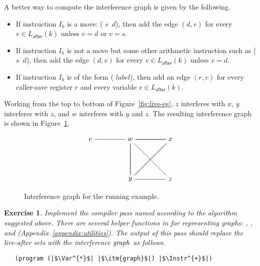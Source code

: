 \documentclass[11pt]{book}
\newtheorem{exercise}[theorem]{Exercise}
\begin{document}
A better way to compute the interference graph is given by the
following.

\begin{itemize}
\item If instruction $I_k$ is a move: ( $s$\, $d$), then add
  the edge $(d,v)$ for every $v \in L_{\mathsf{after}}(k)$ unless $v =
  d$ or $v = s$.

\item If instruction $I_k$ is not a move but some other arithmetic
  instruction such as ( $s$\, $d$), then add the edge $(d,v)$
  for every $v \in L_{\mathsf{after}}(k)$ unless $v = d$.
  
\item If instruction $I_k$ is of the form (
  $\mathit{label}$), then add an edge $(r,v)$ for every caller-save
  register $r$ and every variable $v \in L_{\mathsf{after}}(k)$.
\end{itemize}

Working from the top to bottom of Figure~\ref{fig:live-eg}, $z$
interferes with $x$, $y$ interferes with $z$, and $w$ interferes with
$y$ and $z$.  The resulting interference graph is shown in
Figure~\ref{fig:interfere}.

\begin{figure}[tbp]
\large
\[
\begin{tikzpicture}[baseline=(current  bounding  box.center)]
\node (v) at (0,0)   {$v$};
\node (w) at (2,0)   {$w$};
\node (x) at (4,0)   {$x$};
\node (y) at (2,-2)  {$y$};
\node (z) at (4,-2)  {$z$};

\draw (v) to (w);
\foreach \i in {w,x,y} 
{
  \foreach \j in {w,x,y}
  { 
    \draw (\i) to (\j);
  }
}
\draw (z) to (w);
\draw (z) to (y);
\end{tikzpicture}
\]
\caption{Interference graph for the running example.}
\label{fig:interfere}
\end{figure}


\begin{exercise}\normalfont
Implement the compiler pass named  according
to the algorithm suggested above.  There are several helper functions
in  for representing graphs: ,
, and 
(Appendix~\ref{appendix:utilities}). The output of this pass should
replace the live-after sets with the interference $\mathit{graph}$ as
follows.
\begin{lstlisting}
   (program (|$\Var^{*}$| |$\itm{graph}$|) |$\Instr^{+}$|)
\end{lstlisting}

\end{exercise}
\end{document}
